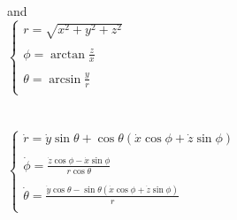 \documentclass[Orbiter Technical Reference.tex]{subfiles}
\begin{document}
\noindent
\\
and\\

$
\left\{
\begin{array}{l}
r = \sqrt{ x^{2} + y^{2} + z^{2} } \\\\
\phi = \arctan \frac{z}{x} \\\\
\theta = \arcsin \frac{y}{r} \\
\end{array} 
\right .
$
\\
\\
\\
\indent
$
\left\{
\begin{array}{l}
\dot{r} = \dot{y} \sin\theta + \cos\theta(\dot{x} \cos\phi + \dot{z} \sin\phi) \\\\
\dot{\phi} = \frac{\dot{z} \cos\phi - \dot{x} \sin\phi}{r \cos\theta} \\\\
\dot{\theta} = \frac{\dot{y} \cos\theta - \sin\theta(\dot{x} \cos\phi + \dot{z} \sin\phi)}{r} \\
\end{array} 
\right .
$
\end{document}
